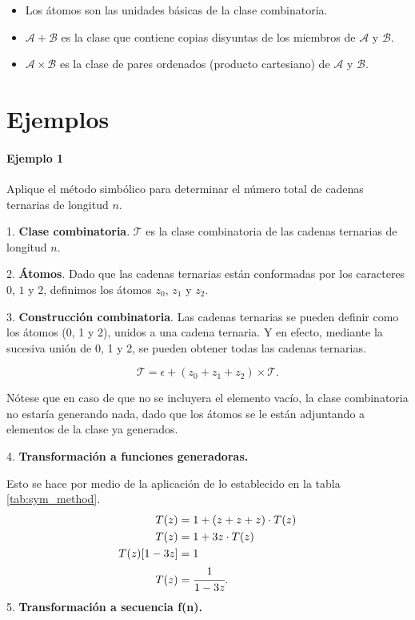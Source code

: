 \begin{itemize}
    \item Los átomos son las unidades básicas de la clase combinatoria.
    \item $\mathcal{A} + \mathcal{B}$ es la clase que contiene copias disyuntas de los miembros de $\mathcal{A}$ y $\mathcal{B}$. 
    \item $\mathcal{A} \times \mathcal{B}$ es la clase de pares ordenados (producto cartesiano) de $\mathcal{A}$ y $\mathcal{B}$.
\end{itemize}

\section*{Ejemplos}

\paragraph{Ejemplo 1}
Aplique el método simbólico para determinar el número total de cadenas ternarias de longitud $n$.

1. \textbf{Clase combinatoria}.
$\mathcal{T}$ es la clase combinatoria de las cadenas ternarias de longitud $n$.

2. \textbf{Átomos}.
Dado que las cadenas ternarias están conformadas por los caracteres $0$, $1$ y $2$, definimos los átomos $z_0,\,z_1$ y $z_2$.

3. \textbf{Construcción combinatoria}.
Las cadenas ternarias se pueden definir como los átomos (0, 1 y 2), unidos a una cadena ternaria. Y en efecto, mediante la sucesiva unión de 0, 1 y 2, se pueden obtener todas las cadenas ternarias.

\begin{equation*}
    \mathcal{T} = \epsilon + (z_0 + z_1 + z_2) \times \mathcal{T}.
\end{equation*}

{\color{magenta} Nótese que en caso de que no se incluyera el elemento vacío, la clase combinatoria no estaría generando nada, dado que los átomos se le están adjuntando a elementos de la clase ya generados.}

4. \textbf{Transformación a funciones generadoras.}

Esto se hace por medio de la aplicación de lo establecido en la tabla \ref{tab:sym_method}.
\begin{equation*}
\begin{split}
    T(z) &= 1 + (z + z + z)\cdot T(z)\\
    T(z) &= 1 + 3z\cdot T(z)\\
    T(z)[1 - 3z] &= 1\\
    T(z) &= \cfrac{1}{1-3z}.
\end{split}
\end{equation*}
5. \textbf{Transformación a secuencia f(n).}

